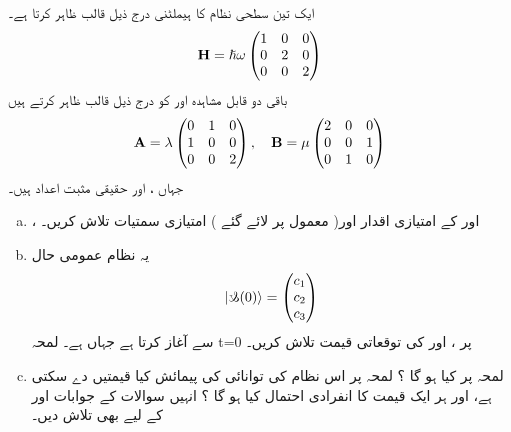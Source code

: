 ایک تین سطحی نظام   کا  ہیملٹنی  درج  ذیل  قالب ظاہر کرتا  ہے۔  
  \begin{align*} 
\bold{H}=\hslash\omega\begin{pmatrix}
1&0&0\\
0&2&0\\
0&0&2
\end{pmatrix} 
  \end{align*} 
باقی  دو قابل مشاہدہ   اور   کو درج  ذیل   قالب ظاہر کرتے ہیں  
  \begin{align*} 
\bold{A}=\lambda\begin{pmatrix}
0&1&0\\
1&0&0\\
0&0&2
\end{pmatrix} ,\quad  \bold{B}=\mu\begin{pmatrix}
2&0&0\\
0&0&1\\
0&1&0
\end{pmatrix}
  \end{align*} 
جہاں ،  اور  حقیقی مثبت اعداد ہیں۔
\begin{enumerate}[a.]
\item
{}،  اور    کے  امتیازی اقدار اور( معمول پر لائے  گئے ) امتیازی  سمتیات  تلاش کریں۔    
 \item
  یہ نظام   عمومی حال
  \begin{align*} 
| \s(0)  \rangle=\begin{pmatrix}
c_{1}\\
c_{2}\\
c_{3}
\end{pmatrix} 
  \end{align*} 
سے  آغاز  کرتا ہے جہاں  ہے۔   لمحہ t=0 پر  ،   اور کی توقعاتی قیمت تلاش  کریں۔  
\item
 لمحہ  پر    کیا   ہو گا  ؟ لمحہ پر اس نظام کی توانائی کی پیمائش کیا   قیمتیں  دے سکتی ہے،  اور ہر ایک قیمت   کا   انفرادی احتمال کیا   ہو گا ؟ انہیں  سوالات کے جوابات   اور  کے لیے بھی تلاش  دیں۔
 \end{enumerate}

